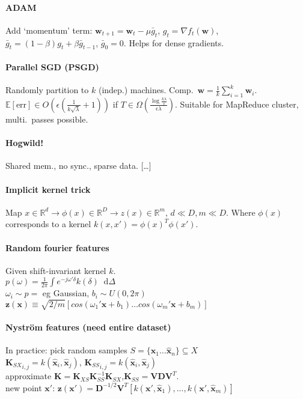 \documentclass[10pt]{scrartcl}
\newcommand*\diff{\mathop{}\!\mathrm{d}}
\newcommand{\eps}{\epsilon}
\newcommand{\R}{\mathbb{R}}
\newcommand{\E}{\mathbb{E}}
\begin{document}
\begin{multicols}{3}
\paragraph{ADAM}
Add `momentum' term: $\bm w_{t+1} = \bm w_t - \mu\bar g_t$, $g_t = \nabla f_t(\bm w)$, $\bar g_t = (1-\beta)g_t + \beta \bar g_{t-1}$, $\bar g_0 = 0$.
Helps for dense gradients.

\paragraph{Parallel SGD (PSGD)}
Randomly partition to $k$ (indep.) machines. Comp.\ $\bm w = \frac{1}{k}\sum_{i=1}^k \bm w_i$.
$\E[\text{err}] \in O(\eps(\frac{1}{k\sqrt\lambda}+1))$ if $T \in \Omega(\frac{\log \frac{k\lambda}{\eps}}{\eps\lambda})$.
Suitable for MapReduce cluster, multi.\ passes possible.

\paragraph{Hogwild!}
Shared mem., no sync., sparse data. [\dots]

\paragraph{Implicit kernel trick}
Map $x \in \R^d \rightarrow \phi(x) \in \R^D \rightarrow z(x) \in \R^m$, $d \ll D, m \ll D$.
Where $\phi(x)$ corresponds to a kernel $k(x,x') = \phi(x)^T\phi(x')$.

\paragraph{Random fourier features}
Given shift-invariant kernel $k$.\\
$p(\omega)=\frac{1}{2\pi}\int e^{-j\omega'\delta}k(\delta) \diff\Delta$ \\
$\omega_i \sim p =$ eg Gaussian, $b_i \sim U(0, 2\pi)$\\
$\bm z(\bm x) \equiv \sqrt{2/m}[cos(\omega_1'\bm x+b_1) \dots cos(\omega_m'\bm x+b_m)]$ 

\paragraph{Nyström features (need entire dataset)}
In practice: pick random samples $S = \{\hat{\bm x}_1 \dots \hat{\bm x}_n\} \subseteq X$ \\
${\bm K_{SX}}_{i,j} = k(\hat{\bm x}_i, \hat{\bm x}_j)$, ${\bm K_{SS}}_{i,j} = k(\hat{\bm x}_i, \hat{\bm x}_j)$\\
approximate $\bm K = \bm K_{XS}\bm K_{SS}^{-1}\bm K_{SX}$,$\bm K_{SS}=\bm V \bm D \bm V^T$.\\
new point $\bm x'$: $\bm z(\bm x') = \bm D^{-1/2} \bm V^T [k(\bm x', \hat{\bm x}_1),...,k(\bm x', \hat{\bm x}_m)]$



\end{multicols}
\end{document}
